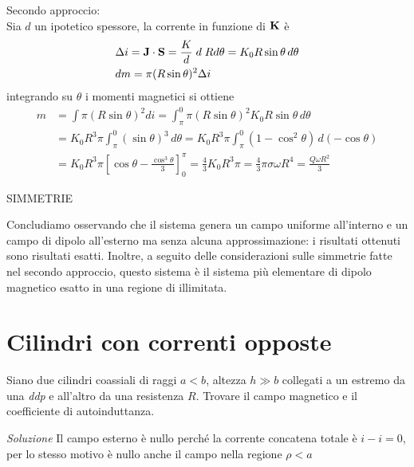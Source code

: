 Secondo approccio:\\
Sia $ d $ un ipotetico spessore, la corrente in funzione di $ \mathbf{ K } $ è
\begin{align}
  &\Delta i = \mathbf{ J } \cdot \mathbf{ S } = \frac{K}{d} \; d \; R d\theta = K_0 R \sin \theta \,d\theta\\
  &dm =  \pi (R \sin \theta )^2 \Delta i
\end{align}
integrando su $ \theta $ i momenti magnetici si ottiene
\begin{align}
  m &= \int \pi (R \sin \theta )^2 di = \int_{\pi}^{0} \pi (R \sin \theta )^2 K_0 R \sin \theta \,d\theta \\
  &= K_0 R^3 \pi \int_{\pi}^{0} \left( \sin\theta \right)^3 \,d\theta = K_0 R^3 \pi \int_{\pi}^{0} \left( 1 - \cos^2 \theta \right)  \,d\left( -\cos\theta \right) \\
  &= K_0 R^3 \pi \left[ \cos\theta - \frac{\cos^3 \theta}{3} \right]_{0}^{\pi} = \frac{4}{3} K_0 R^3 \pi = \frac{4}{3} \pi \sigma \omega R^4 = \frac{Q \omega R^2}{3}
\end{align}

SIMMETRIE

Concludiamo osservando che il sistema genera un campo uniforme all'interno e un campo di dipolo all'esterno ma senza alcuna approssimazione: i risultati 
ottenuti sono risultati esatti. Inoltre, a seguito delle considerazioni sulle simmetrie fatte nel secondo approccio, questo sistema è il sistema più 
elementare di dipolo magnetico esatto in una regione di illimitata. 

\section{Cilindri con correnti opposte}
Siano due cilindri coassiali di raggi $ a < b $, altezza $ h \gg b $ collegati a un estremo da una \textit{ddp} e all'altro da una resistenza $ R $. 
Trovare il campo magnetico e il coefficiente di autoinduttanza.

\textit{Soluzione} Il campo esterno è nullo perché la corrente concatena totale è $ i - i = 0 $, per lo stesso motivo è nullo anche il campo 
nella regione $ \rho < a $

